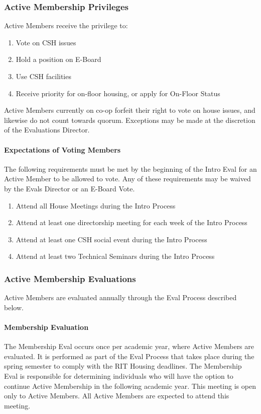 \documentclass{article}
\newcommand{\asubsection}[1]{\subsubsection{#1} \label{#1}}
\newcommand{\asubsubsection}[1]{\paragraph{#1} \label{#1}}
\begin{document}
\asubsection{Active Membership Privileges}
Active Members receive the privilege to:
\begin{enumerate}
	\item Vote on CSH issues
	\item Hold a position on E-Board
	\item Use CSH facilities
	\item Receive priority for on-floor housing, or apply for On-Floor Status
\end{enumerate}

Active Members currently on co-op forfeit their right to vote on house issues, and likewise do not count towards quorum.
Exceptions may be made at the discretion of the Evaluations Director.

\asubsubsection{Expectations of Voting Members}
\renewcommand{\theenumi}{\arabic{enumi}} %

The following requirements must be met by the beginning of the Intro Eval for an Active Member to be allowed to vote.
Any of these requirements may be waived by the Evals Director or an E-Board Vote.
\begin{enumerate}
	\item Attend all House Meetings during the Intro Process
	\item Attend at least one directorship meeting for each week of the Intro Process %
	\item Attend at least one CSH social event during the Intro Process
	\item Attend at least two Technical Seminars during the Intro Process
\end{enumerate}

\asubsection{Active Membership Evaluations}
Active Members are evaluated annually through the Eval Process described below.

\asubsubsection{Membership Evaluation}
The Membership Eval occurs once per academic year, where Active Members are evaluated.
It is performed as part of the Eval Process that takes place during the spring semester to comply with the RIT Housing deadlines.
The Membership Eval is responsible for determining individuals who will have the option to continue Active Membership in the following academic year.
This meeting is open only to Active Members.
All Active Members are expected to attend this meeting.
\end{document}
